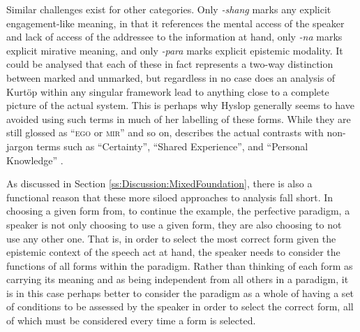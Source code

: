Similar challenges exist for other categories. Only \textit{-shang} marks any explicit engagement-like meaning, in that it references the mental access of the speaker and lack of access of the addressee to the information at hand, only \textit{-na} marks explicit mirative meaning, and only \textit{-para} marks explicit epistemic modality. It could be analysed that each of these in fact represents a two-way distinction between marked and unmarked, but regardless in no case does an analysis of Kurtöp within any singular framework lead to anything close to a complete picture of the actual system. This is perhaps why Hyslop generally seems to have avoided using such terms in much of her labelling of these forms. While they are still glossed as ``\textsc{ego} or \textsc{mir}'' and so on,  describes the actual contrasts with non-jargon terms such as ``Certainty'', ``Shared Experience'', and ``Personal Knowledge'' \cite[113]{Hyslop2014}.

As discussed in Section \ref{ss:Discussion:MixedFoundation}, there is also a functional reason that these more siloed approaches to analysis fall short. In choosing a given form from, to continue the example, the perfective paradigm, a speaker is not only choosing to use a given form, they are also choosing to not use any other one. That is, in order to select the most correct form given the epistemic context of the speech act at hand, the speaker needs to consider the functions of all forms within the paradigm. Rather than thinking of each form as carrying its meaning and as being independent from all others in a paradigm, it is in this case perhaps better to consider the paradigm as a whole of having a set of conditions to be assessed by the speaker in order to select the correct form, all of which must be considered every time a form is selected.

